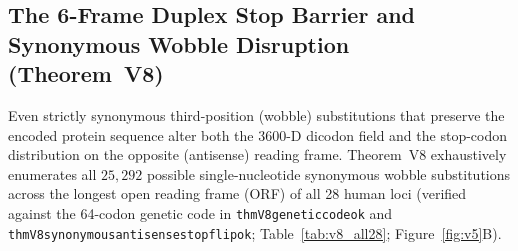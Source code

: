 \documentclass[11pt, a4paper]{article}
\DeclareRobustCommand{\_}{\textunderscore\allowbreak}
\begin{document}
\subsection{The 6-Frame Duplex Stop Barrier and Synonymous Wobble Disruption (Theorem~V8)}

Even strictly synonymous third-position (wobble) substitutions that preserve the encoded protein sequence alter both the 3600-D dicodon field and the stop-codon distribution on the opposite (antisense) reading frame. Theorem~V8 exhaustively enumerates all $25,292$ possible single-nucleotide synonymous wobble substitutions across the longest open reading frame (ORF) of all 28 human loci (verified against the 64-codon genetic code in \texttt{thmV8\_genetic\_code\_64\_ok} and \texttt{thmV8\_synonymous\_antisense\_stop\_flip\_ok}; Table~\ref{tab:v8_all28}; Figure~\ref{fig:v5}B).
\end{document}
